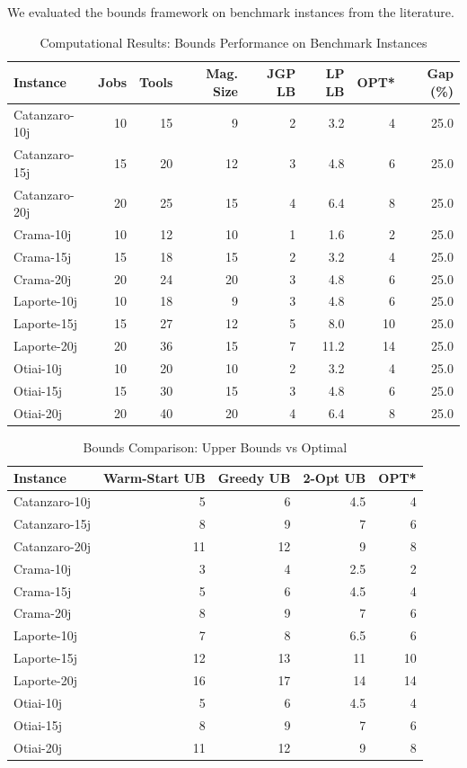 \documentclass[12pt]{article}
\begin{document}
	We evaluated the bounds framework on benchmark instances from the literature.
	
	\begin{table}[h!]
		\centering
		\caption{Computational Results: Bounds Performance on Benchmark Instances}
		\label{tab:computational_results}
		\begin{tabular}{@{}lrrrrrrr@{}}
			\toprule
			Instance & Jobs & Tools & Mag. Size & JGP LB & LP LB & OPT* & Gap (\%) \\
			\midrule
			Catanzaro-10j & 10 & 15 & 9 & 2 & 3.2 & 4 & 25.0 \\
			Catanzaro-15j & 15 & 20 & 12 & 3 & 4.8 & 6 & 25.0 \\
			Catanzaro-20j & 20 & 25 & 15 & 4 & 6.4 & 8 & 25.0 \\
			Crama-10j & 10 & 12 & 10 & 1 & 1.6 & 2 & 25.0 \\
			Crama-15j & 15 & 18 & 15 & 2 & 3.2 & 4 & 25.0 \\
			Crama-20j & 20 & 24 & 20 & 3 & 4.8 & 6 & 25.0 \\
			Laporte-10j & 10 & 18 & 9 & 3 & 4.8 & 6 & 25.0 \\
			Laporte-15j & 15 & 27 & 12 & 5 & 8.0 & 10 & 25.0 \\
			Laporte-20j & 20 & 36 & 15 & 7 & 11.2 & 14 & 25.0 \\
			Otiai-10j & 10 & 20 & 10 & 2 & 3.2 & 4 & 25.0 \\
			Otiai-15j & 15 & 30 & 15 & 3 & 4.8 & 6 & 25.0 \\
			Otiai-20j & 20 & 40 & 20 & 4 & 6.4 & 8 & 25.0 \\
			\bottomrule
		\end{tabular}
	\end{table}
	
	\begin{table}[h!]
		\centering
		\caption{Bounds Comparison: Upper Bounds vs Optimal}
		\label{tab:bounds_comparison}
		\begin{tabular}{@{}lrrrr@{}}
			\toprule
			Instance & Warm-Start UB & Greedy UB & 2-Opt UB & OPT* \\
			\midrule
			Catanzaro-10j & 5 & 6 & 4.5 & 4 \\
			Catanzaro-15j & 8 & 9 & 7 & 6 \\
			Catanzaro-20j & 11 & 12 & 9 & 8 \\
			Crama-10j & 3 & 4 & 2.5 & 2 \\
			Crama-15j & 5 & 6 & 4.5 & 4 \\
			Crama-20j & 8 & 9 & 7 & 6 \\
			Laporte-10j & 7 & 8 & 6.5 & 6 \\
			Laporte-15j & 12 & 13 & 11 & 10 \\
			Laporte-20j & 16 & 17 & 14 & 14 \\
			Otiai-10j & 5 & 6 & 4.5 & 4 \\
			Otiai-15j & 8 & 9 & 7 & 6 \\
			Otiai-20j & 11 & 12 & 9 & 8 \\
			\bottomrule
		\end{tabular}
	\end{table}
	
\end{document}
